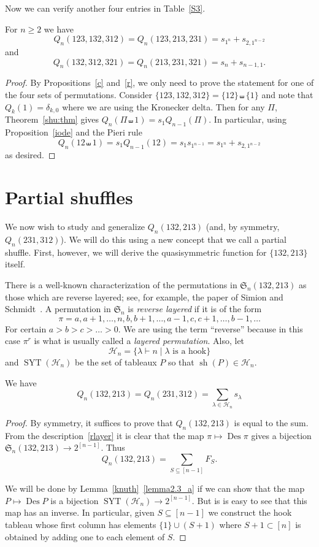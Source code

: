 \documentclass[ALCO,ThmDefs,Unicode,epreuves]{cedram}
\newcommand{\shu}{\shuffle}
\newcommand{\sbs}{\subset}
\newcommand{\sbe}{\subseteq}
\newcommand{\ptn}{\vdash}
\newcommand{\ree}[1]{\eqref{#1}}
\newcommand{\ra}{\rightarrow}
\newcommand{\de}{\delta}
\newcommand{\la}{\lambda}
\newcommand{\cH}{{\mathcal H}}
\newcommand{\fS}{{\mathfrak S}}
\DeclareMathOperator{\Des}{Des}
\DeclareMathOperator{\sh}{sh}
\DeclareMathOperator{\SYT}{SYT}
\begin{document}
Now we can verify another four entries in Table~\ref{S3}.
\begin{theo}
For $n\ge2$ we have
\[
Q_n(123,132,312)=Q_n(123,213,231)= s_{1^n} + s_{2,1^{n-2}}
\]
and
\[
Q_n(132,312,321)=Q_n(213,231,321)=s_n + s_{n-1,1}.
\]
\end{theo}
\begin{proof}
By Propositions~\ref{c} and~\ref{r}, we only need to prove the statement for one of the four sets of permutations. Consider 
$\{123,132,312\}=\{12\}\shu\{1\}$ %
and note that $Q_k(1)=\delta_{k,0}$ where we are using the Kronecker delta.
Then for any $\Pi$, Theorem~\ref{shu:thm} gives 
$Q_n(\Pi\shu 1) = s_1 Q_{n-1}(\Pi)$. In particular, using Proposition~\ref{iode} and the Pieri rule
\[
Q_n(12\shu 1) = s_1 Q_{n-1}(12) = s_1 s_{1^{n-1}}=s_{1^n} + s_{2,1^{n-2}}
\]
as desired.
\end{proof}

\section{Partial shuffles}
\label{psh}

We now wish to study and generalize $Q_n(132,213)$ (and, by symmetry, $Q_n(231,312)$). We will do this using a new concept that we call a partial shuffle. First, however, we will derive the quasisymmetric function for $\{132,213\}$ itself.

There is a well-known characterization of the permutations in $\fS_n(132,213)$ as those which are reverse layered; see, for example, the paper of Simion and Schmidt~\cite{ss:rp}. A permutation in $\fS_n$ is \emph{reverse layered} if it is of the form
\begin{equation}
\label{rlayer}
\pi = a, a+1,\dots, n, b, b+1, \dots, a-1, c, c+1, \dots, b-1, \dots
\end{equation}
For certain $a>b>c>\dots>0$. We are using the term ``reverse'' because in this case $\pi^r$ is what is usually called a \emph{layered permutation}. 
Also, let
\[
\cH_n=\{\la\ptn n \mid \text{$\la$ is a hook}\}
\]
and $\SYT(\cH_n)$ be the set of tableaux $P$ so that $\sh(P) \in \cH_n$.

\begin{prop} 
\label{132,213}
We have
\[
Q_n(132,213)=Q_n(231,312)=\sum_{\la\in\cH_n} s_\la
\]
\end{prop}
\begin{proof}
By symmetry, it suffices to prove that $Q_n(132,213)$ is equal to the sum.
From the description~\ree{rlayer} it is clear that the map $\pi\mapsto\Des\pi$ gives a bijection $\fS_n(132,213)\ra 2^{[n-1]}$. Thus
\[
Q_n(132,213)=\sum_{S\sbe[n-1]} F_S.
\]

We will be done by Lemma~\ref{knuth}~\eqref{lemma2.3_a} if we can show that the map $P\mapsto\Des P$ is a bijection $\SYT(\cH_n)\ra 2^{[n-1]}$. But is is easy to see that this map has an inverse. In particular, given $S\sbe[n-1]$ we construct the hook tableau whose first column has elements $\{1\}\cup (S+1)$ where $S+1\sbs[n]$ is obtained by adding one to each element of $S$.
\end{proof}
\end{document}
